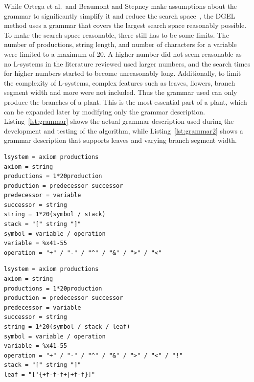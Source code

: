 While Ortega et al.\ and Beaumont and Stepney make assumptions about the grammar to significantly simplify it and reduce the search space~\cite{2003Ortega, 2009Beaumont}, the \gls{DGEL} method uses a grammar that covers the largest search space reasonably possible.
To make the search space reasonable, there still has to be some limits.
The number of productions, string length, and number of characters for a variable were limited to a maximum of 20.
A higher number did not seem reasonable as no \glspl{L-system} in the literature reviewed used larger numbers, and the search times for higher numbers started to become unreasonably long.
Additionally, to limit the complexity of \glspl{L-system}, complex features such as leaves, flowers, \gls{branch segment} width and more were not included.
Thus the grammar used can only produce the branches of a plant.
This is the most essential part of a plant, which can be expanded later by modifying only the grammar description.
Listing~\ref{lst:grammar} shows the actual grammar description used during the development and testing of the algorithm, while Listing~\ref{lst:grammar2} shows a grammar description that supports leaves and varying \gls{branch segment} width.

\begin{lstlisting}[caption={[ABNF grammar description used in DGEL]{ABNF grammar description used in \gls{DGEL}}}, label=lst:grammar, float]
lsystem = axiom productions
axiom = string
productions = 1*20production
production = predecessor successor
predecessor = variable
successor = string
string = 1*20(symbol / stack)
stack = "[" string "]"
symbol = variable / operation
variable = %x41-55
operation = "+" / "-" / "^" / "&" / ">" / "<"
\end{lstlisting}

\begin{lstlisting}[caption={[Extended ABNF grammar description]{ABNF grammar description supporting leaves and varying \gls{branch segment} width}}, label=lst:grammar2, float]
lsystem = axiom productions
axiom = string
productions = 1*20production
production = predecessor successor
predecessor = variable
successor = string
string = 1*20(symbol / stack / leaf)
symbol = variable / operation
variable = %x41-55
operation = "+" / "-" / "^" / "&" / ">" / "<" / "!"
stack = "[" string "]"
leaf = "['{+f-f-f+|+f-f}]"
\end{lstlisting}

